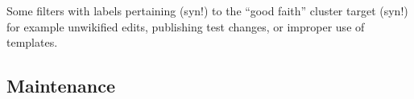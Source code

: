 Some filters with labels pertaining (syn!) to the ``good faith'' cluster target (syn!) for example unwikified edits, publishing test changes, or improper use of templates.


\subsection{Maintenance}

